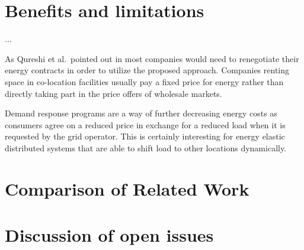 

\section{Benefits and limitations}



...

As Qureshi et al.~pointed out in \cite{qureshi2009cutting} most companies would need to renegotiate their energy contracts in order to utilize the proposed approach. Companies renting space in co-location facilities usually pay a fixed price for energy rather than directly taking part in the price offers of wholesale markets. 

Demand response programs are a way of further decreasing energy costs as consumers agree on a reduced price in exchange for a reduced load when it is requested by the grid operator\cite{albadi2008summary}. This is certainly interesting for energy elastic distributed systems that are able to shift load to other locations dynamically. 



\section{Comparison of Related Work}


\section{Discussion of open issues}